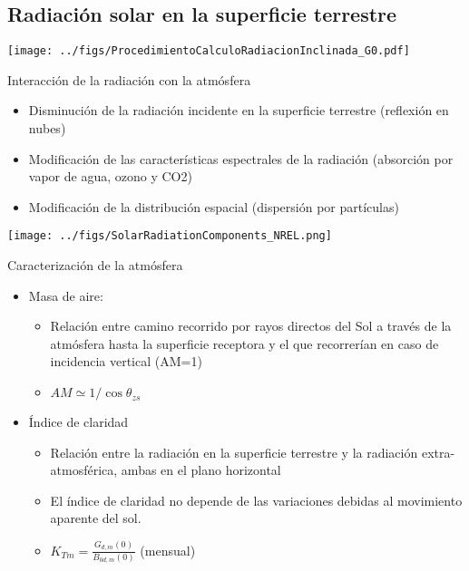 \documentclass[xcolor={usenames,svgnames,dvipsnames}]{beamer}
\begin{document}
\subsection{Radiación solar en la superficie terrestre}
\label{sec:org120d373}
\begin{frame}[label={sec:org7c3d77f}]{}
\begin{center}
\texttt{[image: ../figs/ProcedimientoCalculoRadiacionInclinada\_G0.pdf]}
\end{center}
\end{frame}

\begin{frame}[label={sec:org0252ff7}]{Interacción de la radiación con la atmósfera}
\begin{itemize}
\item \alert{Disminución} de la radiación incidente en la superficie terrestre
(reflexión en nubes)

\item \alert{Modificación de las características espectrales} de la radiación
(absorción por vapor de agua, ozono y CO2)

\item \alert{Modificación de la distribución espacial} (dispersión por
partículas)
\end{itemize}

\begin{center}
\texttt{[image: ../figs/SolarRadiationComponents\_NREL.png]}
\end{center}
\end{frame}

\begin{frame}[label={sec:org1d5a70f}]{Caracterización de la atmósfera}
\begin{itemize}
\item \alert{Masa de aire}:

\begin{itemize}
\item Relación entre camino recorrido por rayos directos del Sol a
través de la atmósfera hasta la superficie receptora y el que recorrerían en caso de incidencia vertical (AM=1)

\item \(AM \simeq 1/\cos\theta_{zs}\)
\end{itemize}

\item \alert{Índice de claridad}

\begin{itemize}
\item Relación entre la radiación en la superficie terrestre y la
radiación extra-atmosférica, ambas en el plano horizontal

\item El índice de claridad \alert{no depende de las variaciones debidas al
movimiento aparente del sol}.

\item \(K_{Tm}=\frac{G_{d,m}(0)}{B_{0d,m}(0)}\) (mensual)
\end{itemize}
\end{itemize}
\end{frame}
\end{document}
